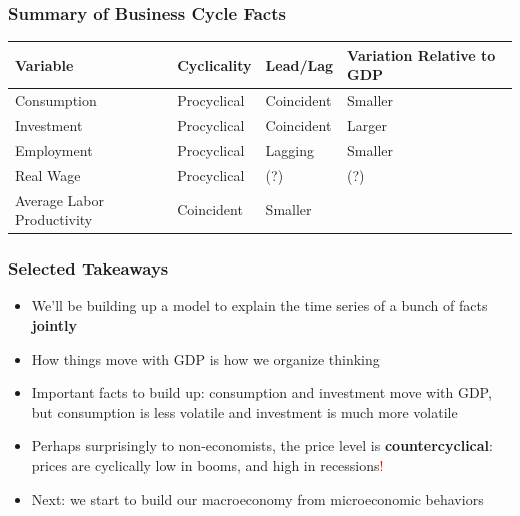 \documentclass{beamer}
\begin{document}
\begin{frame}
\frametitle[alignment=center]{Summary of Business Cycle Facts}
\begin{table}
\centering
\begin{tabular}{llll}
\hline\hline
Variable & Cyclicality & Lead/Lag & Variation Relative to GDP \\
\hline
Consumption & Procyclical & Coincident & Smaller \\
Investment & Procyclical & Coincident & Larger \\
Employment & Procyclical & Lagging & Smaller \\
Real Wage & Procyclical & (?) & (?) \\
 Average Labor Productivity & Coincident & Smaller \\
\hline\hline
\end{tabular}
\end{table}
\end{frame}


\begin{frame}
\frametitle[alignment=center]{Selected Takeaways}
\begin{itemize}
\item We'll be building up a model to explain the time series of a bunch of facts \textbf{jointly}
\bigskip
\item How things move with GDP is how we organize thinking
\bigskip
\item Important facts to build up:  consumption and investment move with GDP, but consumption is less volatile and investment is much more volatile
\bigskip
\item Perhaps surprisingly to non-economists, the price level is \textbf{countercyclical}: prices are cyclically low in booms, and high in recessions\textcolor{red}{!}
\item Next:  we start to build our macroeconomy from microeconomic behaviors
\end{itemize}
\end{frame}
\end{document}
